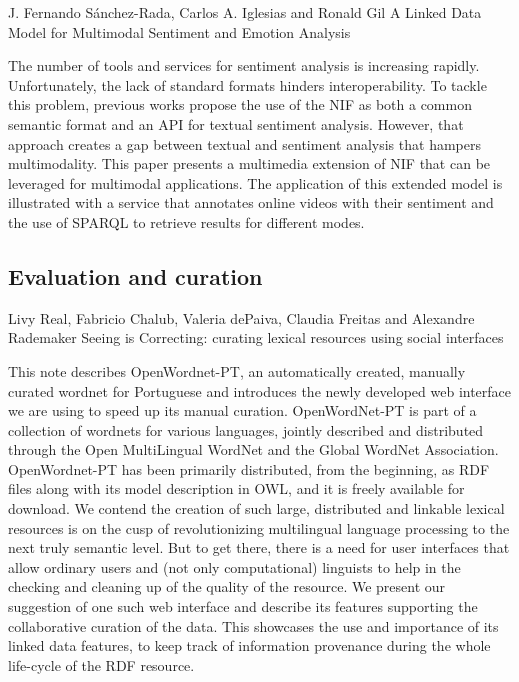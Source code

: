 	J. Fernando Sánchez-Rada, Carlos A. Iglesias and Ronald Gil
	A Linked Data Model for Multimodal Sentiment and Emotion Analysis

		The number of tools and services for sentiment analysis is increasing
		rapidly. Unfortunately, the lack of standard formats hinders
		interoperability. To tackle this problem, previous works propose the use of
		the NIF as both a common semantic format and an API for textual sentiment
		analysis. However, that approach creates a gap between textual and
		sentiment analysis that hampers multimodality. This paper presents a
		multimedia extension of NIF that can be leveraged for multimodal
		applications. The application of this extended model is illustrated with a
		service that annotates online videos with their sentiment and the use of
		SPARQL to retrieve results for different modes.

\subsection{Evaluation and curation}
		
	Livy Real, Fabricio Chalub, Valeria dePaiva, Claudia Freitas and Alexandre Rademaker
	Seeing is Correcting: curating lexical resources using social interfaces

		This note describes OpenWordnet-PT, an automatically created, manually
		curated wordnet for Portuguese and introduces the newly developed web
		interface we are using to speed up its manual curation. OpenWordNet-PT is
		part of a collection of wordnets for various languages, jointly described
		and distributed through the Open MultiLingual WordNet and the Global
		WordNet Association. OpenWordnet-PT has been primarily distributed, from
		the beginning, as RDF files along with its model description in OWL, and it
		is freely available for download. We contend the creation of such large,
		distributed and linkable lexical resources is on the cusp of
		revolutionizing multilingual language processing to the next truly semantic
		level. But to get there, there is a need for user interfaces that allow
		ordinary users and (not only computational) linguists to help in the
		checking and cleaning up of the quality of the resource. We present our
		suggestion of one such web interface and describe its features supporting
		the collaborative curation of the data. This showcases the use and
		importance of its linked data features, to keep track of information
		provenance during the whole life-cycle of the RDF resource.

